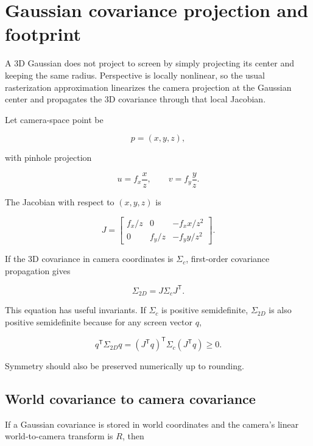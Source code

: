 \hypertarget{appendix-24269cb6977c}{}\label{referencestart:appendix-24269cb6977c}
\section{Gaussian covariance projection and footprint}\label{appendix-24269cb6977c-gaussian-covariance-projection-and-footprint}

\hypertarget{appendix-24269cb6977c-gaussian-covariance-projection-and-footprint}{}

A 3D Gaussian does not project to screen by simply projecting its center and keeping the same radius. Perspective is locally nonlinear, so the usual rasterization approximation linearizes the camera projection at the Gaussian center and propagates the 3D covariance through that local Jacobian.

Let camera-space point be

\[
p=(x,y,z),
\]

with pinhole projection

\[
u=f_x\frac{x}{z},
\qquad
v=f_y\frac{y}{z}.
\]

The Jacobian with respect to \((x,y,z)\) is

\[
J=
\begin{bmatrix}
f_x/z & 0 & -f_xx/z^2\\
0 & f_y/z & -f_yy/z^2
\end{bmatrix}.
\]

If the 3D covariance in camera coordinates is \(\Sigma_c\), first-order covariance propagation gives

\[
\Sigma_{2D}=J\Sigma_cJ^{\mathsf T}.
\]

This equation has useful invariants. If \(\Sigma_c\) is positive semidefinite, \(\Sigma_{2D}\) is also positive semidefinite because for any screen vector \(q\),

\[
q^{\mathsf T}\Sigma_{2D}q
=
(J^{\mathsf T}q)^{\mathsf T}\Sigma_c(J^{\mathsf T}q)
\ge0.
\]

Symmetry should also be preserved numerically up to rounding.

\subsection{World covariance to camera covariance}\label{appendix-24269cb6977c-world-covariance-to-camera-covariance}

\hypertarget{appendix-24269cb6977c-world-covariance-to-camera-covariance}{}

If a Gaussian covariance is stored in world coordinates and the camera's linear world-to-camera transform is \(R\), then

